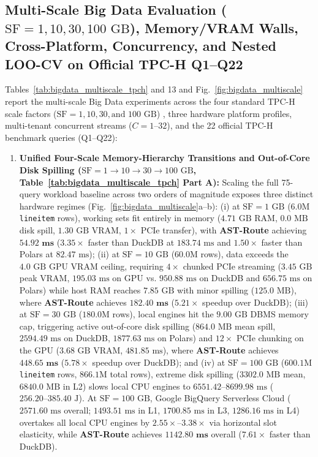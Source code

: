 \documentclass[10pt,a4paper]{article}
\begin{document}
\subsection{Multi-Scale Big Data Evaluation ($\text{SF}=1, 10, 30, 100\text{ GB}$), Memory/VRAM Walls, Cross-Platform, Concurrency, and Nested LOO-CV on Official TPC-H Q1--Q22}
Tables~\ref{tab:bigdata_multiscale_tpch} and 13 and Fig.~\ref{fig:bigdata_multiscale} report the multi-scale Big Data experiments across the four standard TPC-H scale factors ($\text{SF}=1, 10, 30, \text{and } 100\text{ GB}$) \cite{tpc2022tpch, dreseler2020quantifying}, three hardware platform profiles, multi-tenant concurrent streams ($C=1\text{--}32$), and the 22 official TPC-H benchmark queries (Q1--Q22):
\begin{enumerate}[leftmargin=1.5em,itemsep=2pt]
    \item \textbf{Unified Four-Scale Memory-Hierarchy Transitions and Out-of-Core Disk Spilling ($\text{SF}=1 \rightarrow 10 \rightarrow 30 \rightarrow 100\text{ GB}$, Table~\ref{tab:bigdata_multiscale_tpch} Part A):} Scaling the full 75-query workload baseline across two orders of magnitude exposes three distinct hardware regimes (Fig.~\ref{fig:bigdata_multiscale}a--b): (i) at $\text{SF}=1\text{ GB}$ ($6.0\text{M}$ \texttt{lineitem} rows), working sets fit entirely in memory ($4.71\text{ GB}$ RAM, $0.0\text{ MB}$ disk spill, $1.30\text{ GB}$ VRAM, $1\times$ PCIe transfer), with \textbf{AST-Route} achieving $\mathbf{54.92\text{ ms}}$ ($3.35\times$ faster than DuckDB at $183.74\text{ ms}$ and $1.50\times$ faster than Polars at $82.47\text{ ms}$); (ii) at $\text{SF}=10\text{ GB}$ ($60.0\text{M}$ rows), data exceeds the $4.0\text{ GB}$ GPU VRAM ceiling, requiring $4\times$ chunked PCIe streaming ($3.45\text{ GB}$ peak VRAM, $195.03\text{ ms}$ on GPU vs. $950.88\text{ ms}$ on DuckDB and $656.75\text{ ms}$ on Polars) while host RAM reaches $7.85\text{ GB}$ with minor spilling ($125.0\text{ MB}$), where \textbf{AST-Route} achieves $\mathbf{182.40\text{ ms}}$ ($\mathbf{5.21\times}$ speedup over DuckDB); (iii) at $\text{SF}=30\text{ GB}$ ($180.0\text{M}$ rows), local engines hit the $9.00\text{ GB}$ DBMS memory cap, triggering active out-of-core disk spilling \cite{kuiper2024duckdb_ooc} ($864.0\text{ MB}$ mean spill, $2594.49\text{ ms}$ on DuckDB, $1877.63\text{ ms}$ on Polars) and $12\times$ PCIe chunking on the GPU ($3.68\text{ GB}$ VRAM, $481.85\text{ ms}$), where \textbf{AST-Route} achieves $\mathbf{448.65\text{ ms}}$ ($\mathbf{5.78\times}$ speedup over DuckDB); and (iv) at $\text{SF}=100\text{ GB}$ ($600.1\text{M}$ \texttt{lineitem} rows, $866.1\text{M}$ total rows), extreme disk spilling ($3302.0\text{ MB}$ mean, $6840.0\text{ MB}$ in L2) slows local CPU engines to $6551.42\text{--}8699.98\text{ ms}$ ($256.20\text{--}385.40\text{ J}$). At $\text{SF}=100\text{ GB}$, Google BigQuery Serverless Cloud ($2571.60\text{ ms}$ overall; $1493.51\text{ ms}$ in L1, $1700.85\text{ ms}$ in L3, $1286.16\text{ ms}$ in L4) overtakes all local CPU engines by $\mathbf{2.55\times\text{--}3.38\times}$ via horizontal slot elasticity, while \textbf{AST-Route} achieves $\mathbf{1142.80\text{ ms}}$ overall ($\mathbf{7.61\times}$ faster than DuckDB).

\end{enumerate}
\end{document}
